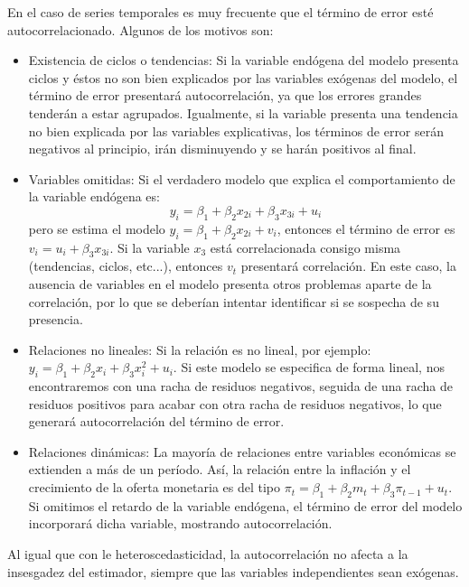 En el caso de series temporales es muy frecuente que el t\'ermino de error est\'e autocorrelacionado. Algunos de los motivos son:
\begin{itemize}
\item Existencia de ciclos o tendencias: Si la variable end\'ogena del modelo
presenta ciclos y \'estos no son bien explicados por las variables ex\'ogenas
del modelo, el t\'ermino de error presentar\'a autocorrelaci\'on, ya que
los errores grandes tender\'an a estar agrupados. Igualmente, si la
variable presenta una tendencia no bien explicada por las variables
explicativas, los t\'erminos de error ser\'an negativos al principio,
ir\'an disminuyendo y se har\'an positivos al final.
\item Variables omitidas: Si el verdadero modelo que explica el comportamiento
de la variable end\'ogena es:
\[
y_{i}=\beta_{1}+\beta_{2}x_{2i}+\beta_{3}x_{3i}+u_{i}
\]
pero se estima el modelo $y_{i}=\beta_{1}+\beta_{2}x_{2i}+v_{i}$,
entonces el t\'ermino de error es $v_{i}=u_{i}+\beta_{3}x_{3i}$. Si
la variable $x_{3}$ est\'a correlacionada consigo misma (tendencias,
ciclos, etc...), entonces $v_{t}$ presentar\'a correlaci\'on. En este
caso, la ausencia de variables en el modelo presenta otros problemas
aparte de la correlaci\'on, por lo que se deber\'ian intentar identificar
si se sospecha de su presencia.
\item Relaciones no lineales: Si la relaci\'on es no lineal, por ejemplo:
$y_{i}=\beta_{1}+\beta_{2}x_{i}+\beta_{3}x_{i}^{2}+u_{i}$. Si este
modelo se especifica de forma lineal, nos encontraremos con una racha
de residuos negativos, seguida de una racha de residuos positivos
para acabar con otra racha de residuos negativos, lo que generar\'a
autocorrelaci\'on del t\'ermino de error.
\item Relaciones din\'amicas: La mayor\'ia de relaciones entre variables econ\'omicas
se extienden a m\'as de un per\'iodo. As\'i, la relaci\'on entre la inflaci\'on
y el crecimiento de la oferta monetaria es del tipo $\pi_{t}=\beta_{1}+\beta_{2}m_{t}+\beta_{3}\pi_{t-1}+u_{t}$.
Si omitimos el retardo de la variable end\'ogena, el t\'ermino de error
del modelo incorporar\'a dicha variable, mostrando autocorrelaci\'on.
\end{itemize}


Al igual que con le heteroscedasticidad, la autocorrelaci\'on no afecta a la insesgadez del estimador, siempre que las variables independientes sean ex\'ogenas.

